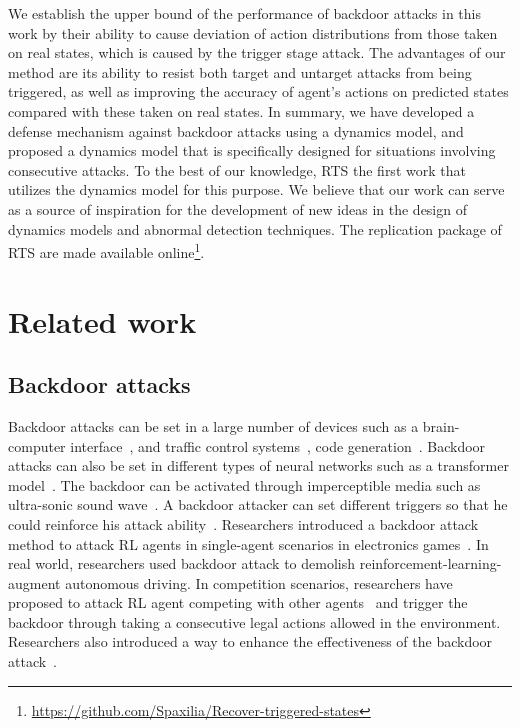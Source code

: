 \documentclass[letterpaper, 10 pt, conference]{ieeeconf}  %
\begin{document}
We establish the upper bound of the performance of backdoor attacks in this work by their ability to cause deviation of action distributions from those taken on real states, which is caused by the trigger stage attack. The advantages of our method are its ability to resist both target and untarget attacks from being triggered, as well as improving the accuracy of agent's actions on predicted states compared with these taken on real states. In summary, we have developed a defense mechanism against backdoor attacks using a dynamics model, and proposed a dynamics model that is specifically designed for situations involving consecutive attacks. To the best of our knowledge, RTS the first work that utilizes the dynamics model for this purpose. We believe that our work can serve as a source of inspiration for the development of new ideas in the design of dynamics models and abnormal detection techniques. The replication package of RTS are made available online\footnote{\url{https://github.com/Spaxilia/Recover-triggered-states}}.


\section{Related work}
\subsection{Backdoor attacks}
Backdoor attacks can be set in a large number of devices such as a brain-computer interface~\cite{trojanBrain}, and traffic control systems~\cite{trojanTraffic}, code generation~\cite{yang2023stealthy}. Backdoor attacks can also be set in different types of neural networks such as a transformer model~\cite{trojanTransformer}. The backdoor can be activated through imperceptible media such as ultra-sonic sound wave~\cite{trojanUltrasonic}. A backdoor attacker can set different triggers so that he could reinforce his attack ability~\cite{Trojanmulti}. Researchers introduced a backdoor attack method to attack RL agents in single-agent scenarios in electronics games~\cite{trojdrl}. In real world, researchers used backdoor attack to demolish reinforcement-learning-augment autonomous driving. In competition scenarios, researchers have proposed to attack RL agent competing with other agents~\cite{PRE-trojancompetition,chen2022curiosity} and trigger the backdoor through taking a consecutive legal actions allowed in the environment. Researchers also introduced a way to enhance the effectiveness of the backdoor attack~\cite{gong2022mind}.
\end{document}

